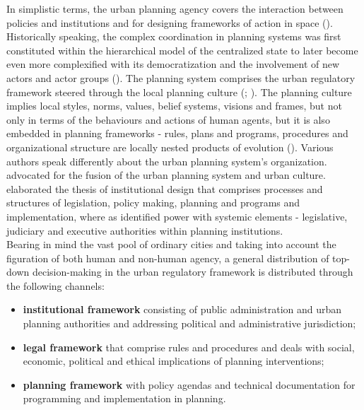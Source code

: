\documentclass[11pt]{report}
\begin{document}
{{{In simplistic terms, the urban planning agency covers the interaction between policies and institutions and for designing frameworks of action in space (\href{Getimis}{\citealt{getimis_comparing_2012}}).
Historically speaking, the complex coordination in planning systems was first constituted within the hierarchical model of the centralized state to later become even more complexified with its democratization and the involvement of new actors and actor groups 
(\href{Van}{\citealt{van_assche_co-evolutions_2013}}).
The planning system comprises the urban regulatory framework steered through the local planning culture (\href{Getimis}{\citealt{getimis_comparing_2012}}; \href{Peric}{\citealt{peric_evolution_2016}}).
The planning culture implies local styles, norms, values, belief systems, visions and frames, but not only in terms of the behaviours and actions of human agents, but it is also embedded in planning frameworks - rules, plans and programs, procedures and organizational structure are locally nested products of evolution (\href{Moroni}{\citealt{moroni_evolutionary_2010}}).
Various authors speak differently about the urban planning system’s organization. \href{Getimis}{\cite{Getimis XX}} advocated  for the fusion of the urban planning system and urban culture. 
\href{Alexander}{\cite{alexander_institutional_2005}} elaborated the thesis of institutional design that comprises processes and structures of legislation, policy making, planning and programs and implementation, where as \href{Portugali}{\cite{Portugali_Self-planned_2011}} identified power with systemic elements - legislative, judiciary and executive authorities within planning institutions.
\\

Bearing in mind the vast pool of ordinary cities and taking into account the figuration of both human and non-human agency, a general distribution of top-down decision-making in the urban regulatory framework is distributed through the following channels:

\begin{itemize}
\item \textbf{institutional framework} consisting of public administration and urban planning authorities and addressing political and administrative jurisdiction;
\item \textbf{legal framework} that comprise rules and procedures and deals with social, economic, political and ethical implications of planning interventions;
\item \textbf{planning framework} with policy agendas and technical documentation for programming and implementation in planning.
\end{itemize}

}}}
\end{document}
